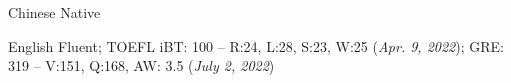 


\begin{cvskills}


\cvskill
{Chinese} %
{Native} %


\cvskill
{English}
{Fluent; TOEFL iBT: 100 -- R:24, L:28, S:23, W:25 (\textit{Apr. 9, 2022}); GRE: 319 -- V:151, Q:168, AW: 3.5 (\textit{July 2, 2022})}

\end{cvskills}